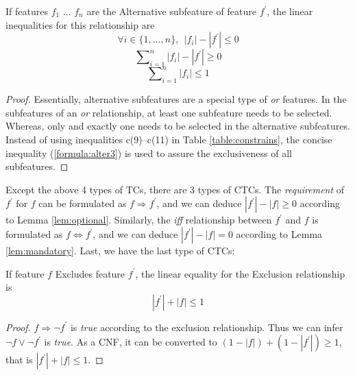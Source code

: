 \begin{lem}If features $f_1$ ... $f_n$ are the Alternative subfeature of feature $f^\prime$, the linear inequalities for this relationship are
  \begin{equation}
  \forall  i \in  \{1,...,n\}, ~~ |f_i| -  |f^\prime|  \le 0
  \end{equation}
  \begin{equation}
  \sum\nolimits_{i=1}^{n}{|f_i|} - |f^\prime| \ge 0
  \end{equation}
  \vspace{-4mm}
  \begin{equation}
  \sum\nolimits_{i=1}^{n}{|f_i|}  \le 1 \label{formula:alter3}
  \end{equation}
  \end{lem}
\begin{proof}
Essentially, alternative subfeatures are a special type of \emph{or} features. In the subfeatures of an \emph{or} relationship, at least one subfeature needs to be selected. Whereas, only and exactly one needs to be selected in the alternative subfeatures. Instead of using inequalities  c(9)--c(11) in Table \ref{table:constrains}, the concise inequality (\ref{formula:alter3}) is  used to assure the exclusiveness of all subfeatures.
\end{proof}
Except the above 4 types of TCs, there are 3 types of CTCs. The \emph{requirement} of $f^\prime$ for $f$ can be formulated as $f \Rightarrow f^\prime$, and we can deduce $|f^\prime|-|f| \ge 0$ according to Lemma \ref{lem:optional}. Similarly, the \emph{iff} relationship between $f^\prime$ and $f$ is formulated as $f \Leftrightarrow f^\prime$, and we can deduce  $|f^\prime| - |f| = 0$ according to Lemma \ref{lem:mandatory}. Last, we have the last type of CTCs:

\begin{lem}If feature $f$ Excludes feature $f^\prime$, the linear equality for the Exclusion relationship is
  \begin{equation}
   |f^\prime| + |f| \le 1
  \end{equation}
  \end{lem}
\begin{proof}
$f \Rightarrow \neg f^\prime$ is \emph{true} according to the exclusion relationship. Thus we can infer $\neg f  \lor \neg f^\prime$  is \emph{true}. As a CNF, it can be converted to $(1-|f|)+(1-|f^\prime|) \ge 1$, that is $  |f^\prime| + |f| \le 1$.
\end{proof}


